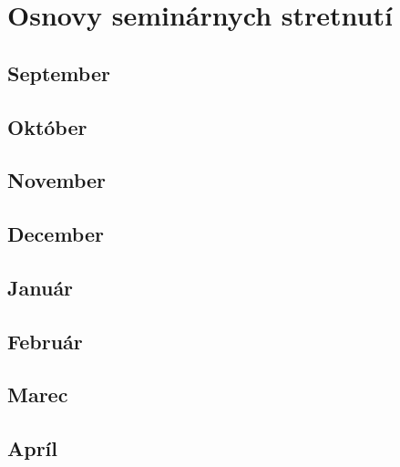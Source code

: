 \chapter{Osnovy seminárnych stretnutí}

\section{September}




\section{Október}





\section{November}





\section{December}




\section{Január}





\section{Február}




\section{Marec}





\section{Apríl}





